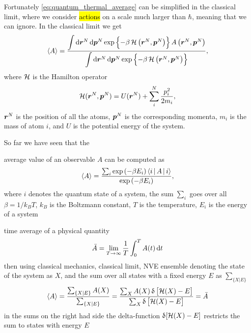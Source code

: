 Fortunately \cref{eq:quantum_thermal_average} can be simplified in the classical limit, where we consider \hl{actions} on a scale much larger than $\hbar$, meaning that we can ignore. In the classical limit we get
\begin{align*}
    \left\langle A\right\rangle = \frac
    {
        \bigint \dif \bvec r^N \dif \bvec p^N \exp 
        \left\{
            -\beta \Ham \left( \bvec r^N, \bvec p^N \right)
        \right\} 
        A\left(\bvec r^N, \bvec p^N\right)
    }
    {
        \bigint \dif \bvec r^N \dif \bvec p^N \exp 
        \left\{
            -\beta \Ham\left( \bvec r^N, \bvec p^N \right)
        \right\}
    },
\end{align*}
where $\operatorname{\mathcal{H}}$ is the Hamilton operator
\begin{align*}
    \operatorname{\mathcal{H}}(\boldsymbol{r}^N, \boldsymbol{p}^N) = 
        U(\boldsymbol{r}^N) + \sum_i^N \frac{p_i^2}{2m_i},
\end{align*}
$\boldsymbol{r}^N$ is the position of all the atoms, $\boldsymbol{p}^N$ is the corresponding momenta, $m_i$ is the mass of atom $i$, and $U$ is the potential energy of the system.

So far we have seen that the 

average value of an observable $A$ can be computed as
\begin{align*}
    \langle A \rangle =
    \frac{
        \sum_i \exp \left( -\beta E_i \right) \Braket{i|A|i}
    }{
        \exp \left( -\beta E_i \right)
    },
\end{align*}
where $i$ denotes the quantum state of a system, the sum $\sum_i$ goes over all  $\beta = 1/k_B T$, $k_B$ is the Boltzmann constant, $T$ is the temperature, $E_i$ is the energy of a system 


time average of a physical quantity
\begin{align*}
    \bar A = \lim_{T\rightarrow \infty} \frac{1}{T} \int_0^T A(t) \dif t
\end{align*}
then using classical mechanics, classical limit, NVE ensemble
denoting the state of the system as $X$, and the sum over all states with a fixed energy $E$ as $\sum_{\{X|E\}}$
\begin{align*}
    \langle A \rangle = 
    \frac{
        \sum_{\{X|E\}} A(X)
    }{
        \sum_{\{X|E\}}
    }
    =
    \frac{
        \sum_X A(X) \operatorname{\updelta} \left[ \operatorname{\mathcal{H}}(X) - E \right]
    }{
        \sum_X \operatorname{\updelta} \left[ \operatorname{\mathcal{H}}(X) - E \right]
    }
    = \bar A
\end{align*}
in the sums on the right had side the delta-function $\operatorname{\updelta}[\operatorname{\mathcal{H}}(X)-E]$ restricts the sum to states with energy $E$


